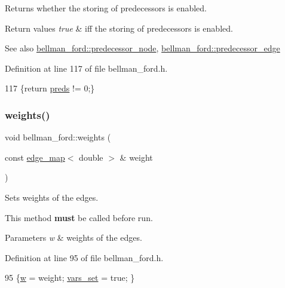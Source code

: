 Returns whether the storing of predecessors is enabled. 


\begin{DoxyRetVals}{Return values}
{\em true} & iff the storing of predecessors is enabled. ~\newline
 \\
\hline
\end{DoxyRetVals}
\begin{DoxySeeAlso}{See also}
\mbox{\hyperlink{classbellman__ford_a403e286ec8cbe3c30a7a729c5041155e}{bellman\+\_\+ford\+::predecessor\+\_\+node}}, \mbox{\hyperlink{classbellman__ford_a39f93b0b1e427cf26059fa6141c6f61c}{bellman\+\_\+ford\+::predecessor\+\_\+edge}} 
\end{DoxySeeAlso}


Definition at line 117 of file bellman\+\_\+ford.\+h.


\begin{DoxyCode}
117 \{\textcolor{keywordflow}{return} \mbox{\hyperlink{classbellman__ford_a1ce37529c697ec5b89e8dc09204e4f59}{preds}} != 0;\}
\end{DoxyCode}
\mbox{\label{classbellman__ford_a9e276cc9f30c2e608d320db4a08b2a74}} 
\subsubsection{\texorpdfstring{weights()}{weights()}}
{\footnotesize\ttfamily void bellman\+\_\+ford\+::weights (\begin{DoxyParamCaption}\item[{const \mbox{\hyperlink{classedge__map}{edge\+\_\+map}}$<$ double $>$ \&}]{weight }\end{DoxyParamCaption})\hspace{0.3cm}{\ttfamily [inline]}}



Sets weights of the edges. 

This method {\bfseries must} be called before run.


\begin{DoxyParams}{Parameters}
{\em w} & weights of the edges. \\
\hline
\end{DoxyParams}


Definition at line 95 of file bellman\+\_\+ford.\+h.


\begin{DoxyCode}
95 \{\mbox{\hyperlink{classbellman__ford_ae05c9a40c2257f1e1f333b6a4f6fa656}{w}} = weight; \mbox{\hyperlink{classbellman__ford_a0b727de83366d019041694f890f19dbb}{vars\_set}} = \textcolor{keyword}{true}; \}
\end{DoxyCode}


